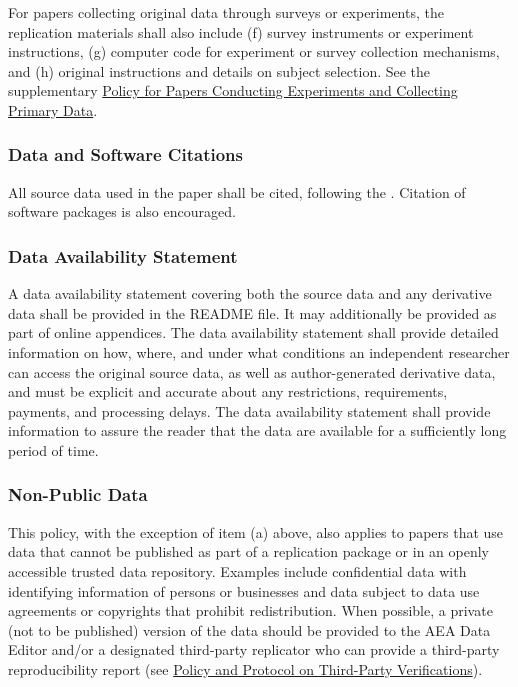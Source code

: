 For papers collecting original data through surveys or experiments, the
replication materials shall also include (f) survey instruments or
experiment instructions, (g) computer code for experiment or survey
collection mechanisms, and (h) original instructions and details on
subject selection. See the supplementary 
\hyperref[policy-for-papers-conducting-experiments-and-collecting-primary-data]{Policy for Papers Conducting Experiments and Collecting Primary  Data}.

\subsubsection{Data and Software
Citations}\label{data-and-software-citations}

All source data used in the paper shall be cited, following the
.
Citation of software packages is also encouraged.

\subsubsection{Data Availability
Statement}\label{data-availability-statement}

A data availability statement covering both the source data and any
derivative data shall be provided in the README file. It may
additionally be provided as part of online appendices. The data
availability statement shall provide detailed information on how, where,
and under what conditions an independent researcher can access the
original source data, as well as author-generated derivative data, and
must be explicit and accurate about any restrictions, requirements,
payments, and processing delays. The data availability statement shall
provide information to assure the reader that the data are available for
a sufficiently long period of time.

\subsubsection{Non-Public Data}\label{non-public-data}

This policy, with the exception of item (a) above, also applies to
papers that use data that cannot be published as part of a replication
package or in an openly accessible trusted data repository. Examples
include confidential data with identifying information of persons or
businesses and data subject to data use agreements or copyrights that
prohibit redistribution. When possible, a private (not to be published)
version of the data should be provided to the AEA Data Editor and/or a
designated third-party replicator who can provide a third-party reproducibility report (see \hyperref[policy-and-protocol-on-third-party-verifications]{Policy and Protocol on Third-Party Verifications}).

